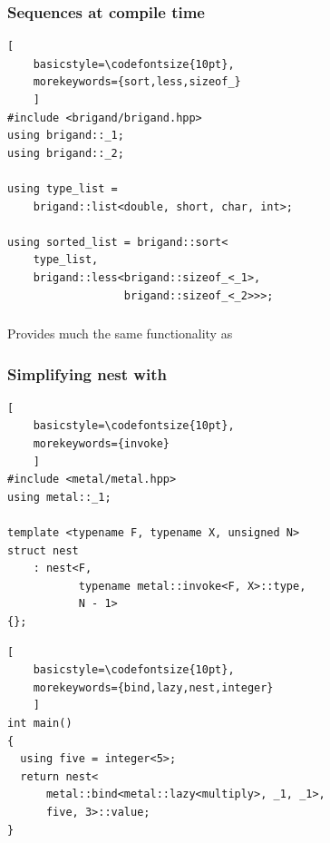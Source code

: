 \documentclass[14pt]{beamer}
\begin{document}
\begin{frame}[fragile]
  \frametitle{Sequences at compile time}

  \begin{lstlisting}[
    basicstyle=\codefontsize{10pt},
    morekeywords={sort,less,sizeof_}
    ]
#include <brigand/brigand.hpp>
using brigand::_1;
using brigand::_2;

using type_list =
    brigand::list<double, short, char, int>;

using sorted_list = brigand::sort<
    type_list,
    brigand::less<brigand::sizeof_<_1>,
                  brigand::sizeof_<_2>>>;
  \end{lstlisting}
  
\end{frame}

\begin{frame}
  \frametitle{}

  Provides much the same functionality as 

  \vspace{.5cm}


\end{frame}

\begin{frame}[fragile]
  \frametitle{Simplifying nest with }
  
  \begin{lstlisting}[
    basicstyle=\codefontsize{10pt},
    morekeywords={invoke}
    ]
#include <metal/metal.hpp>
using metal::_1;

template <typename F, typename X, unsigned N>
struct nest
    : nest<F,
           typename metal::invoke<F, X>::type,
           N - 1>
{};
  \end{lstlisting}

  \begin{lstlisting}[
    basicstyle=\codefontsize{10pt},
    morekeywords={bind,lazy,nest,integer}
    ]
int main()
{
  using five = integer<5>;
  return nest<
      metal::bind<metal::lazy<multiply>, _1, _1>,
      five, 3>::value;
}
  \end{lstlisting}
  
\end{frame}
\end{document}
